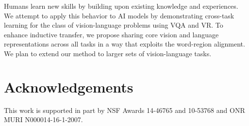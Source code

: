 \documentclass[10pt,twocolumn,letterpaper]{article}
\begin{document}
Humans learn new skills by building upon existing knowledge and experiences. We attempt to apply this behavior to AI models by demonstrating cross-task learning for the class of vision-language problems using VQA and VR. To enhance inductive transfer, we propose sharing core vision and language representations across all tasks in a way that exploits the word-region alignment. We plan to extend our method to larger sets of vision-language tasks. 


\section{Acknowledgements}
This work is supported in part by NSF Awards 14-46765 and 10-53768 and ONR MURI N000014-16-1-2007.

{\small


}
\end{document}
